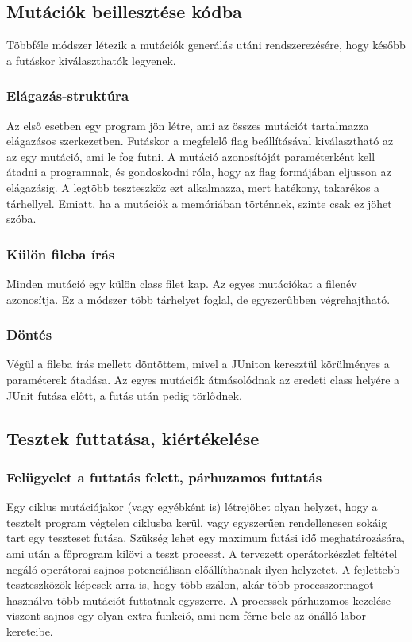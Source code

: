 \subsection{Mutációk beillesztése kódba}
Többféle módszer létezik a mutációk generálás utáni rendszerezésére, hogy később a futáskor kiválaszthatók legyenek.
\subsubsection{Elágazás-struktúra}
Az első esetben egy program jön létre, ami az összes mutációt tartalmazza elágazásos szerkezetben. Futáskor a megfelelő flag beállításával kiválasztható az az egy mutáció, ami le fog futni. A mutáció azonosítóját paraméterként kell átadni a programnak, és gondoskodni róla, hogy az flag formájában eljusson az elágazásig. A legtöbb teszteszköz ezt alkalmazza, mert hatékony, takarékos a tárhellyel. Emiatt, ha a mutációk a memóriában történnek, szinte csak ez jöhet szóba.
\subsubsection{Külön fileba írás}
Minden mutáció egy külön class filet kap. Az egyes mutációkat a filenév azonosítja. Ez a módszer több tárhelyet foglal, de egyszerűbben végrehajtható.
\subsubsection{Döntés}
Végül a fileba írás mellett döntöttem, mivel a JUniton keresztül körülményes a paraméterek átadása. Az egyes mutációk átmásolódnak az eredeti class helyére a JUnit futása előtt, a futás után pedig törlődnek.
\subsection{Tesztek futtatása, kiértékelése}

\subsubsection{Felügyelet a futtatás felett, párhuzamos futtatás}
Egy ciklus mutációjakor (vagy egyébként is) létrejöhet olyan helyzet, hogy a tesztelt program végtelen ciklusba kerül, vagy egyszerűen rendellenesen sokáig tart egy teszteset futása. Szükség lehet egy maximum futási idő meghatározására, ami után a főprogram kilövi a teszt processt. A tervezett operátorkészlet feltétel negáló operátorai sajnos potenciálisan előállíthatnak ilyen helyzetet. A fejlettebb teszteszközök képesek arra is, hogy több szálon, akár több processzormagot használva több mutációt futtatnak egyszerre. A processek párhuzamos kezelése viszont sajnos egy olyan extra funkció, ami nem férne bele az önálló labor kereteibe.
